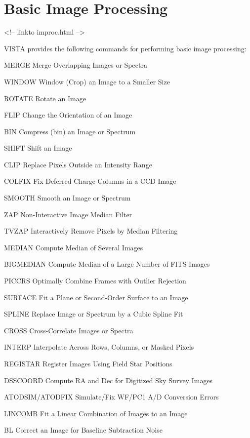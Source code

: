 \chapter{Basic Image Processing}
\begin{rawhtml}
<!-- linkto improc.html -->
\end{rawhtml}

%
%
%
%

VISTA provides the following commands for performing basic image
processing:
\begin{example}
  \item[MERGE\hfill]{Merge Overlapping Images or Spectra}
  \item[WINDOW\hfill]{Window (Crop) an Image to a Smaller Size}
  \item[ROTATE\hfill]{Rotate an Image}
  \item[FLIP\hfill]{Change the Orientation of an Image}
  \item[BIN\hfill]{Compress (bin) an Image or Spectrum}
  \item[SHIFT\hfill]{Shift an Image}
  \item[CLIP\hfill]{Replace Pixels Outside an Intensity Range}
  \item[COLFIX\hfill]{Fix Deferred Charge Columns in a CCD Image}
  \item[SMOOTH\hfill]{Smooth an Image or Spectrum}
  \item[ZAP\hfill]{Non-Interactive Image Median Filter}
  \item[TVZAP\hfill]{Interactively Remove Pixels by Median Filtering}
  \item[MEDIAN\hfill]{Compute Median of Several Images}
  \item[BIGMEDIAN\hfill]{Compute Median of a Large Number of FITS Images}
  \item[PICCRS\hfill]{Optimally Combine Frames with Outlier Rejection}
  \item[SURFACE\hfill]{Fit a Plane or Second-Order Surface to an Image}
  \item[SPLINE\hfill]{Replace Image or Spectrum by a Cubic Spline Fit}
  \item[CROSS\hfill]{Cross-Correlate Images or Spectra}
  \item[INTERP\hfill]{Interpolate Across Rows, Columns, or Masked Pixels}
  \item[REGISTAR\hfill]{Register Images Using Field Star Positions}
  \item[DSSCOORD\hfill]{Compute RA and Dec for Digitized Sky Survey Images}
  \item[ATODSIM/ATODFIX\hfill]{Simulate/Fix WF/PC1 A/D Conversion Errors}
  \item[LINCOMB\hfill]{Fit a Linear Combination of Images to an Image}
  \item[BL\hfill]{Correct an Image for Baseline Subtraction Noise}
\end{example}

